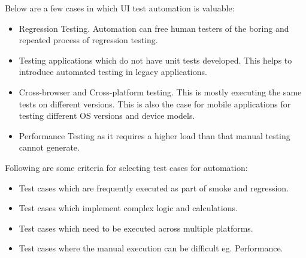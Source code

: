 Below are a few cases in which UI test automation is valuable:
\begin{itemize}
	\item Regression Testing. Automation can free human testers of the boring and repeated process of regression testing.
	\item Testing applications which do not have unit tests developed. This helps to introduce automated testing in legacy applications.
	\item Cross-browser and Cross-platform testing. This is mostly executing the same tests on different versions. This is also the case for mobile applications for testing different OS versions and device models.
	\item Performance Testing as it requires a higher load than that manual testing cannot generate.

\end{itemize}
Following are some criteria for selecting test cases for automation:
\begin{itemize}
	\item Test cases which are frequently executed as part of smoke and regression.
	\item Test cases which implement complex logic and calculations.
	\item Test cases which need to be executed across multiple platforms.
	\item Test cases where the manual execution can be difficult eg. Performance.
\end{itemize}